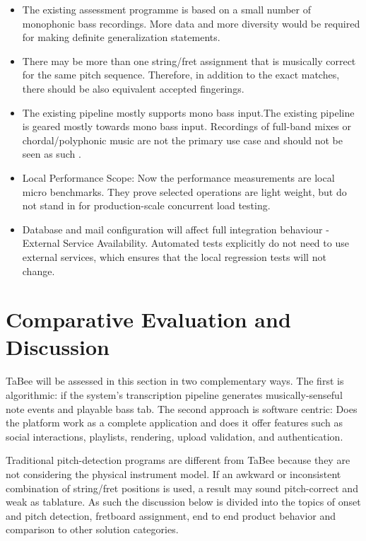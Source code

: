 \documentclass[a4paper, 12pt, titlepage]{article}
\begin{document}
\begin{itemize}
    \item The existing assessment programme is based on a small number of monophonic bass recordings. More data and more diversity would be required for making definite generalization statements.
    \item There may be more than one string/fret assignment that is musically correct for the same pitch sequence. Therefore, in addition to the exact matches, there should be also equivalent accepted fingerings.
    \item The existing pipeline mostly supports mono bass input.The existing pipeline is geared mostly towards mono bass input. Recordings of full-band mixes or chordal/polyphonic music are not the primary use case and should not be seen as such \cite{smaragdis2003,virtanen2007,benetos2013}.
    \item Local Performance Scope: Now the performance measurements are local micro benchmarks. They prove selected operations are light weight, but do not stand in for production-scale concurrent load testing.
    \item Database and mail configuration will affect full integration behaviour - External Service Availability. Automated tests explicitly do not need to use external services, which ensures that the local regression tests will not change.
\end{itemize}

\newpage
\section{Comparative Evaluation and Discussion}
\label{sec:evaluation}

TaBee will be assessed in this section in two complementary ways. The first is algorithmic: if the system's transcription pipeline generates musically-senseful note events and playable bass tab. The second approach is software centric: Does the platform work as a complete application and does it offer features such as social interactions, playlists, rendering, upload validation, and authentication.

Traditional pitch-detection programs are different from TaBee because they are not considering the physical instrument model. If an awkward or inconsistent combination of string/fret positions is used, a result may sound pitch-correct and weak as tablature. As such the discussion below is divided into the topics of onset and pitch detection, fretboard assignment, end to end product behavior and comparison to other solution categories.
\end{document}
